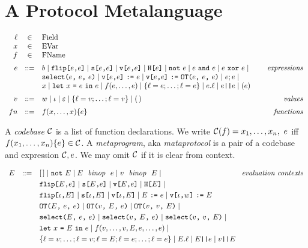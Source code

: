 \section{A Protocol Metalanguage}
\label{section-metalang}

$$
\begin{array}{rcl@{\hspace{8mm}}r}
\flab &\in& \mathrm{Field}\\
x &\in& \mathrm{EVar}\\
f &\in& \mathrm{FName}\\[2mm]
e &::=& b \mid \flip{e}{e} \mid \secret{e}{e} \mid \view{e}{e} \mid \oracle{e} \mid \enot\ e \mid e\ \eand\ e \mid e\ \exor\ e \mid & \textit{expressions}\\[0mm]
& & \select{e}{e}{e} \mid 
\send{\view{e}{e}}{e} \mid \send{\view{e}{e}}{\OT{e}{e}{e}} \mid e;e \mid \\[0mm]
& & x \mid \elet{x}{e}{e} \mid f(e,\ldots,e) \mid \{ \flab = e; \ldots; \flab = e \}
\mid e.\flab \mid e\ttt{||}e \mid (e) \\[2mm]
v &::=& w \mid \cid \mid \be \mid \{ \flab = v;\ldots;\flab = v \} 
\mid (\,) & \textit{values}\\[2mm]
{fn} &::=& f(x,\ldots,x) \{ e \} & \textit{functions}
\end{array}
$$

\begin{definition}
A \emph{codebase} $\mathcal{C}$ is a list of function 
declarations. We write $ \mathcal{C}(f) = x_1,\ldots,x_n,\ e$
iff $f(x_1,\ldots,x_n) \{ e \} \in \mathcal{C}$.
A \emph{metaprogram}, aka \emph{mataprotocol} is a pair of a 
codebase and expression $\mathcal{C}, e$. We may omit
$\mathcal{C}$ if it is clear from context.  
\end{definition}

$$
\begin{array}{rcl@{\hspace{3mm}}r}
E &::=& [\,] \mid \enot\ E \mid E\ \bop\ e \mid v\ \bop\ E \mid & \textit{evaluation contexts}\\[1mm]
& & \flip{E}{e} \mid \secret{E}{e} \mid \view{E}{e} \mid \oracle{E} \mid  \\[1mm]
& & \flip{\cid}{E} \mid \secret{\cid}{E} \mid \view{\cid}{E} \mid \send{E}{e} \mid \send{\view{\cid}{w}}{E}\\[1mm]
& & \OT{E}{e}{e} \mid \OT{v}{E}{e} \mid \OT{v}{v}{E} \mid\\[1mm]
& & \select{E}{e}{e} \mid \select{v}{E}{e} \mid \select{v}{v}{E} \mid\\[1mm]
& & \elet{x}{E}{e} \mid f(v,\ldots,v,E,e,\ldots,e) \mid \\[1mm]
& & \{ \flab = v;\ldots;\flab = v;\flab = E;\flab = e;\ldots;\flab = e \} \mid E.\flab \mid E\ttt{||}e \mid v \ttt{||}E
\end{array}
$$

